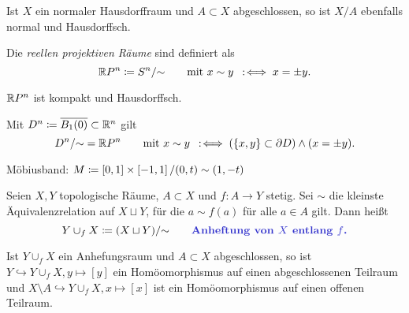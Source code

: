 \documentclass{cheat-sheet}
\begin{document}
\begin{prop}
  Ist $X$ ein normaler Hausdorffraum und $A \subset X$ abgeschlossen, so ist $X/A$ ebenfalls normal und Hausdorffsch.
\end{prop}


\begin{defn}
  Die \emph{reellen projektiven Räume} sind definiert als
  \[ \mathbb{R} P^n \coloneqq S^n/{\sim} \qquad \text{mit } x \sim y \enspace:\!\iff x = \pm y. \]
\end{defn}

\begin{prop}
  $\mathbb{R} P^n$ ist kompakt und Hausdorffsch.
\end{prop}

\begin{bem}
  Mit $D^n \coloneqq \overline{B_1(0)} \subset \mathbb{R}^n$ gilt
  \[ D^n / {\sim} = \mathbb{R} P^n \qquad \text{mit } x \sim y \enspace:\!\iff (\{ x, y \} \subset \partial D) \wedge (x = \pm y). \]
\end{bem}


\begin{bsp}
  Möbiusband: $M \coloneqq \left[ 0, 1 \right] \times \left[ -1, 1 \right] / (0, t) \sim (1, -t)$
\end{bsp}


\begin{defn}
  Seien $X, Y$ topologische Räume, $A \subset X$ und $f : A \to Y$ stetig. Sei ${\sim}$ die kleinste Äquivalenzrelation auf $X \sqcup Y$, für die $a \sim f(a)$ für alle $a \in A$ gilt. Dann heißt
  \[
    Y \cup_f X \coloneqq (X \sqcup Y) / {\sim}
    \qquad \text{\emph{Anheftung von $X$ entlang $f$.}}
  \]
\end{defn}

\begin{prop}
  Ist $Y \cup_f X$ ein Anhefungsraum und $A \subset X$ abgeschlossen, so ist $Y \hookrightarrow Y \cup_f X, y \mapsto [y]$ ein Homöomorphismus auf einen abgeschlossenen Teilraum und $X \setminus A \hookrightarrow Y \cup_f X, x \mapsto [x]$ ist ein Homöomorphismus auf einen offenen Teilraum.
\end{prop}
\end{document}
